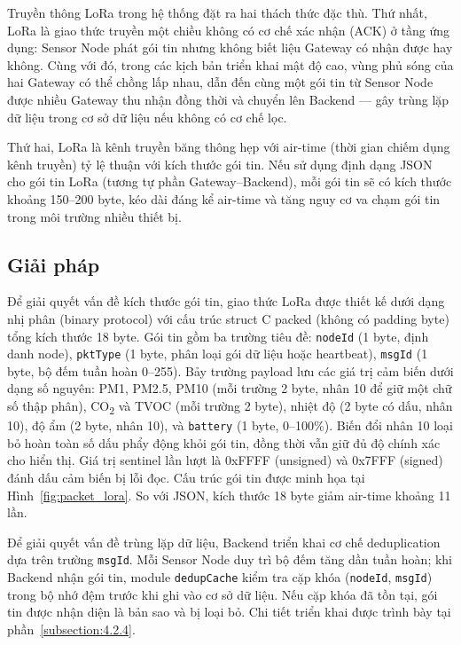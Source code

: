 \documentclass[../DoAn.tex]{subfiles}
\begin{document}
Truyền thông \gls{LoRa} trong hệ thống đặt ra hai thách thức đặc thù. Thứ nhất, LoRa là giao thức truyền một chiều không có cơ chế xác nhận (ACK) ở tầng ứng dụng: Sensor Node phát gói tin nhưng không biết liệu Gateway có nhận được hay không. Cùng với đó, trong các kịch bản triển khai mật độ cao, vùng phủ sóng của hai Gateway có thể chồng lấp nhau, dẫn đến cùng một gói tin từ Sensor Node được nhiều Gateway thu nhận đồng thời và chuyển lên Backend — gây trùng lặp dữ liệu trong cơ sở dữ liệu nếu không có cơ chế lọc.

Thứ hai, LoRa là kênh truyền băng thông hẹp với air-time (thời gian chiếm dụng kênh truyền) tỷ lệ thuận với kích thước gói tin. Nếu sử dụng định dạng \gls{JSON} cho gói tin LoRa (tương tự phần Gateway–Backend), mỗi gói tin sẽ có kích thước khoảng 150–200 byte, kéo dài đáng kể air-time và tăng nguy cơ va chạm gói tin trong môi trường nhiều thiết bị.

\subsection{Giải pháp}
\label{subsection:5.2.2}

Để giải quyết vấn đề kích thước gói tin, giao thức LoRa được thiết kế dưới dạng nhị phân (binary protocol) với cấu trúc struct C packed (không có padding byte) tổng kích thước 18 byte. Gói tin gồm ba trường tiêu đề: \texttt{nodeId} (1 byte, định danh node), \texttt{pktType} (1 byte, phân loại gói dữ liệu hoặc heartbeat), \texttt{msgId} (1 byte, bộ đếm tuần hoàn 0–255). Bảy trường payload lưu các giá trị cảm biến dưới dạng số nguyên: PM1, PM2.5, PM10 (mỗi trường 2 byte, nhân 10 để giữ một chữ số thập phân), CO\textsubscript{2} và TVOC (mỗi trường 2 byte), nhiệt độ (2 byte có dấu, nhân 10), độ ẩm (2 byte, nhân 10), và \texttt{battery} (1 byte, 0–100\%). Biến đổi nhân 10 loại bỏ hoàn toàn số dấu phẩy động khỏi gói tin, đồng thời vẫn giữ đủ độ chính xác cho hiển thị. Giá trị sentinel lần lượt là 0xFFFF (unsigned) và 0x7FFF (signed) đánh dấu cảm biến bị lỗi đọc. Cấu trúc gói tin được minh họa tại Hình~\ref{fig:packet_lora}. So với JSON, kích thước 18 byte giảm air-time khoảng 11 lần.

Để giải quyết vấn đề trùng lặp dữ liệu, Backend triển khai cơ chế deduplication dựa trên trường \texttt{msgId}. Mỗi Sensor Node duy trì bộ đếm tăng dần tuần hoàn; khi Backend nhận gói tin, module \texttt{dedupCache} kiểm tra cặp khóa (\texttt{nodeId}, \texttt{msgId}) trong bộ nhớ đệm trước khi ghi vào cơ sở dữ liệu. Nếu cặp khóa đã tồn tại, gói tin được nhận diện là bản sao và bị loại bỏ. Chi tiết triển khai được trình bày tại phần~\ref{subsection:4.2.4}.
\end{document}
